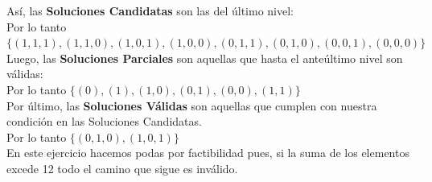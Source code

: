 \documentclass[10pt,a4paper]{article}
\begin{document}
Así, las \textbf{Soluciones Candidatas} son las del último nivel: \\
Por lo tanto $\{(1, 1, 1), (1, 1, 0), (1,0,1), (1,0,0), (0,1,1), (0,1,0), (0,0,1), (0,0,0)\}$ \\
Luego, las \textbf{Soluciones Parciales} son aquellas que hasta el anteúltimo nivel son válidas: \\
Por lo tanto $\{(0), (1), (1,0), (0,1), (0, 0), (1, 1)\}$ \\
Por último, las \textbf{Soluciones Válidas} son aquellas que cumplen con nuestra condición en las Soluciones Candidatas. \\
Por lo tanto $\{(0,1,0), (1,0,1)\}$ \\

En este ejercicio hacemos podas por factibilidad pues, si la suma de los elementos excede 12 todo el camino que sigue es inválido.
\end{document}
